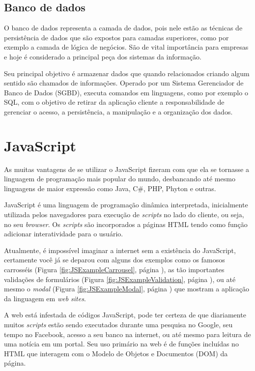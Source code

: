 \documentclass[
	12pt,				%
	openright,			%
	twoside,			%
	a4paper,			%
	english,			%
	brazil				%
	]{abntex2}
\begin{document}
\subsection{Banco de dados}
\label{subsec:BancoDeDados}

O banco de dados representa a camada de dados, pois nele estão as técnicas de persistência de dados que são expostos para camadas superiores, como por exemplo a camada de lógica de negócios. São de vital importância para empresas e hoje é considerado a principal peça dos sistemas da informação.

Seu principal objetivo é armazenar dados que quando relacionados criando algum sentido são chamados de informações. Operado por um Sistema Gerenciador de Banco de Dados (SGBD), executa comandos em linguagens, como por exemplo o SQL, com o objetivo de retirar da aplicação cliente a responsabilidade de gerenciar o acesso, a persistência, a manipulação e a organização dos dados.

\section{JavaScript}

As muitas vantagens de se utilizar o JavaScript fizeram com que ela se tornasse a linguagem de programação mais popular do mundo, desbancando até mesmo linguagens de maior expressão como Java, C\#, PHP, Phyton e outras.

JavaScript é uma linguagem de programação dinâmica interpretada, inicialmente utilizada pelos navegadores para execução de \textit{scripts} no lado do cliente, ou seja, no seu \textit{browser}. Os \textit{scripts} são incorporados a páginas HTML tendo como função adicionar interatividade para o usuário.

Atualmente, é impossível imaginar a internet sem a existência do JavaScript, certamente você já se deparou com alguns dos exemplos como os famosos carrosséis (Figura \ref{fig:JSExampleCarrousel}, página \pageref{fig:JSExampleCarrousel}), as tão importantes validações de formulários (Figura \ref{fig:JSExampleValidation}, página \pageref{fig:JSExampleValidation}), ou até mesmo o \textit{modal} (Figura \ref{fig:JSExampleModal}, página \pageref{fig:JSExampleModal}) que mostram a aplicação da linguagem em \textit{web sites}.

A web está infestada de códigos JavaScript, pode ter certeza de que diariamente muitos \textit{scripts} estão sendo executados durante uma pesquisa no Google, seu tempo no Facebook, acesso a seu banco na internet, ou até mesmo para leitura de uma notícia em um portal. Seu uso primário na web é de funções incluídas no HTML que interagem com o Modelo de Objetos e Documentos (DOM) da página.
\end{document}

